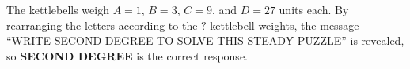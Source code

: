 


  The kettlebells weigh \(A=1\), \(B=3\), \(C=9\), and \(D=27\) units each.
  By rearranging the letters according to the \(?\) kettlebell weights,
  the message ``WRITE SECOND DEGREE TO SOLVE THIS STEADY PUZZLE''
  is revealed, so
  \textbf{SECOND DEGREE} is the correct response.
